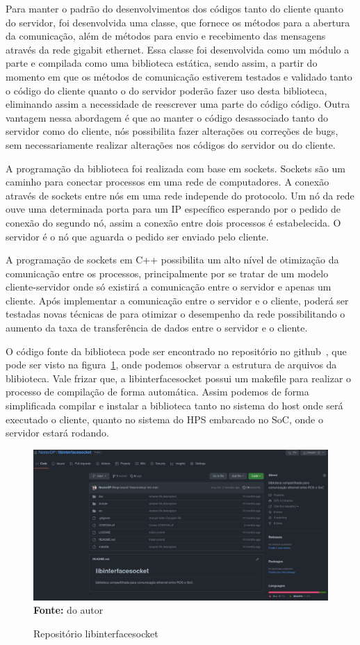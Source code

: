 Para manter o padrão do desenvolvimentos dos códigos tanto do cliente quanto do servidor, foi desenvolvida uma classe, que fornece os métodos para a abertura da comunicação, além de métodos para envio e recebimento das mensagens através da rede gigabit ethernet. Essa classe foi desenvolvida como um módulo a parte e compilada como uma biblioteca estática, sendo assim, a partir do momento em que os métodos de comunicação estiverem testados e validado tanto o código do cliente quanto o do servidor poderão fazer uso desta biblioteca, eliminando assim a necessidade de reescrever uma parte do código código. Outra vantagem nessa abordagem é que ao manter o código desassociado tanto do servidor como do cliente, nós possibilita fazer alterações ou correções de bugs, sem necessariamente realizar alterações nos códigos do servidor ou do cliente.

A programação da biblioteca foi realizada com base em sockets. Sockets são um caminho para conectar processos em uma rede de computadores. A conexão através de sockets entre nós em uma rede independe do protocolo. Um nó da rede ouve uma determinada porta para um IP específico esperando por o pedido de conexão do segundo nó, assim a conexão entre dois processos é estabelecida. O servidor é o nó que aguarda o pedido ser enviado pelo cliente.

A programação de sockets em C++ possibilita um alto nível de otimização da comunicação entre os processos, principalmente por se tratar de um modelo cliente-servidor onde só existirá a comunicação entre o servidor e apenas um cliente. Após implementar a comunicação entre o servidor e o cliente, poderá ser testadas novas técnicas de para otimizar o desempenho da rede possibilitando o aumento da taxa de transferência de dados entre o servidor e o cliente.

O código fonte da biblioteca pode ser encontrado no repositório no github~\cite{Pereira-Neto-Biblioteca}, que pode ser visto na figura~\ref{fig:gitlib}, onde podemos observar a estrutura de arquivos da blibioteca. Vale frizar que, a libinterfacesocket possui um makefile para realizar o processo de compilação de forma automática. Assim podemos de forma simplificada compilar e instalar a biblioteca tanto no sistema do host onde será executado o cliente, quanto no sistema do HPS embarcado no SoC, onde o servidor estará rodando. 

\begin{figure}[ht]
	\caption{Repositório libinterfacesocket}
	\begin{center}
		\includegraphics[scale=0.26]{imagens/git_libinterfacesocket.png}\\
		{\small \textbf{Fonte:} do autor}
    \end{center}\label{fig:gitlib}
\end{figure}
